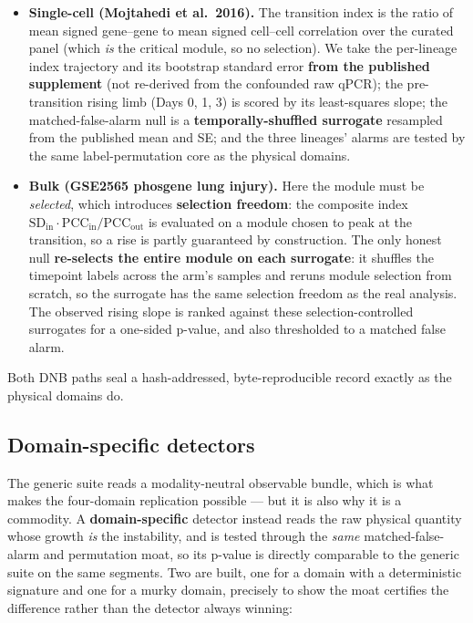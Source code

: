 \documentclass[11pt]{article}
\begin{document}
\begin{itemize}
  \item \textbf{Single-cell (Mojtahedi et al.\ 2016).} The transition
    index is the ratio of mean signed gene--gene to mean signed
    cell--cell correlation over the curated panel (which \emph{is} the
    critical module, so no selection). We take the per-lineage index
    trajectory and its bootstrap standard error \textbf{from the
    published supplement} (not re-derived from the confounded raw qPCR);
    the pre-transition rising limb (Days 0, 1, 3) is scored by its
    least-squares slope; the matched-false-alarm null is a
    \textbf{temporally-shuffled surrogate} resampled from the published
    mean and SE; and the three lineages' alarms are tested by the same
    label-permutation core as the physical domains.
  \item \textbf{Bulk (GSE2565 phosgene lung injury).} Here the module
    must be \emph{selected}, which introduces \textbf{selection
    freedom}: the composite index
    $\mathrm{SD_{in}} \cdot \mathrm{PCC_{in}} / \mathrm{PCC_{out}}$ is
    evaluated on a module chosen to peak at the transition, so a rise is
    partly guaranteed by construction. The only honest null
    \textbf{re-selects the entire module on each surrogate}: it shuffles
    the timepoint labels across the arm's samples and reruns module
    selection from scratch, so the surrogate has the same selection
    freedom as the real analysis. The observed rising slope is ranked
    against these selection-controlled surrogates for a one-sided
    p-value, and also thresholded to a matched false alarm.
\end{itemize}

Both DNB paths seal a hash-addressed, byte-reproducible record exactly
as the physical domains do.

\subsection{Domain-specific detectors}

The generic suite reads a modality-neutral observable bundle, which is
what makes the four-domain replication possible --- but it is also why
it is a commodity. A \textbf{domain-specific} detector instead reads the
raw physical quantity whose growth \emph{is} the instability, and is
tested through the \emph{same} matched-false-alarm and permutation moat,
so its p-value is directly comparable to the generic suite on the same
segments. Two are built, one for a domain with a deterministic signature
and one for a murky domain, precisely to show the moat certifies the
difference rather than the detector always winning:
\end{document}
